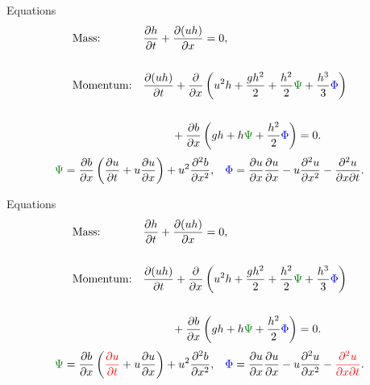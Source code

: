 \documentclass[pdf]{beamer}
\begin{document}
\begin{frame}{Equations}
	\begin{subequations}
		\begin{align*}
		&\text{Mass:} && \frac{\partial h}{\partial t} + \dfrac{\partial (uh)}{\partial x} = 0,  \\ \\
		&\text{Momentum:} &&\dfrac{\partial (uh)}{\partial t} + \dfrac{\partial}{\partial x} \left ( u^2h + \dfrac{gh^2}{2} + \dfrac{h^2}{2}{ \color{green!50!black}\Psi } + \dfrac{h^3}{3}{ { \color{blue} \Phi } }  \right )   \\ \\& &&\quad \quad \; \; +  \dfrac{\partial b}{\partial x} \left (gh +   h { \color{green!50!black}\Psi } + \dfrac{h^2}{2}{ { \color{blue} \Phi } }  \right ) = 0.
		\end{align*}
	\end{subequations}
	\begin{align*}
	&{ \color{green!50!black}\Psi }  = \dfrac{\partial b}{\partial x}\left(\dfrac{\partial u}{\partial t} + u\dfrac{\partial u}{\partial x} \right)  + u^2\dfrac{\partial^2 b}{\partial x^2}, &
	{ \color{blue} \Phi }  = \dfrac{\partial u }{\partial x} \dfrac{\partial u}{\partial x} -u \dfrac{\partial^2 u}{\partial x^2}  - \dfrac{\partial^2 u}{\partial x \partial t} .
	\end{align*}
\end{frame}

\begin{frame}{Equations}
	\begin{subequations}
		\begin{align*}
		&\text{Mass:} && \frac{\partial h}{\partial t} + \dfrac{\partial (uh)}{\partial x} = 0,  \\ \\
		&\text{Momentum:} &&\dfrac{\partial (uh)}{\partial t} + \dfrac{\partial}{\partial x} \left ( u^2h + \dfrac{gh^2}{2} + \dfrac{h^2}{2}{ \color{green!50!black}\Psi } + \dfrac{h^3}{3}{ { \color{blue} \Phi } }  \right )   \\ \\& &&\quad \quad \; \; +  \dfrac{\partial b}{\partial x} \left (gh +   h { \color{green!50!black}\Psi } + \dfrac{h^2}{2}{ { \color{blue} \Phi } }  \right ) = 0.
		\end{align*}
	\end{subequations}
	\begin{align*}
	&{ \color{green!50!black}\Psi }  = \dfrac{\partial b}{\partial x}\left( {\color{red}\dfrac{\partial u}{\partial t}} + u\dfrac{\partial u}{\partial x} \right)  + u^2\dfrac{\partial^2 b}{\partial x^2}, &
	{ \color{blue} \Phi }  = \dfrac{\partial u }{\partial x} \dfrac{\partial u}{\partial x} -u \dfrac{\partial^2 u}{\partial x^2}  - {\color{red}\dfrac{\partial^2 u}{\partial x \partial t}} .
	\end{align*}
\end{frame}
\end{document}
